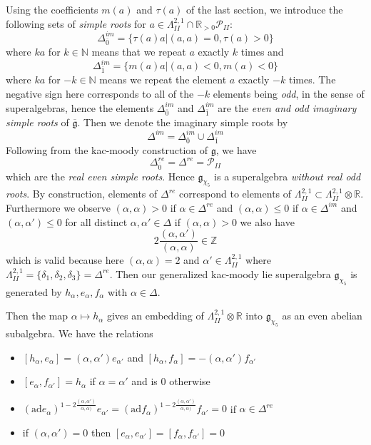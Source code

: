 \documentclass[9pt]{amsart} \usepackage[utf8]{inputenc}
\newcommand{\N}{\mathbb{N}}
\newcommand{\Z}{\mathbb{Z}} \newcommand{\C}{\mathbb{C}}
\newcommand{\R}{\mathbb{R}} \newcommand{\La}{\Lambda}
\newcommand{\Poly}{\mathcal{P}}
\newcommand{\bkm}{\mathfrak{g}}
\newcommand{\autcor}{\mathfrak{g}_{\chi_5}}
\begin{document}
Using the coefficients $m(a)$ and $\tau(a)$ of the last section, we
introduce the following sets of \textit{simple roots} for $a \in
\La^{2,1}_{II} \cap \R_{>0} \Poly_{II}$:
$$\Delta_{\overline{0}}^{im} = \{\tau(a)a | (a,a) = 0,\tau(a)>0\}$$
where $ka$ for $k\in \N$ means that we repeat $a$ exactly $k$ times and
$$\Delta_{\overline{1}}^{im} = \{ m(a)a | (a,a) < 0 , m(a)< 0\}$$
where $ka$ for $-k \in \N$ means we repeat the element $a$ exactly $-k$
times. The negative sign here corresponds to all of the $-k$ elements
being \textit{odd}, in the sense of superalgebras, hence the elements
$\Delta_{\overline{0}}^{im}$ and $\Delta_{\overline{1}}^{im}$ are the
\textit{even and odd imaginary simple roots} of
$\overline{\mathfrak{g}}$.
Then we denote the imaginary simple roots by $$\Delta^{im} =
\Delta_{\overline{0}}^{im} \cup \Delta_{\overline{1}}^{im}$$
Following from the kac-moody construction of $\bkm$, we
have $$\Delta_{\overline{0}}^{re} = \Delta^{re} = \Poly_{II}$$ which are
the \textit{real even simple roots}. Hence
$\autcor$ is a superalgebra \textit{without real odd
roots}. By construction, elements of $\Delta^{re}$ correspond to
elements of $\La^{2,1}_{II} \subset \La^{2,1}_{II}\otimes \R$.
Furthermore we observe $(\alpha,\alpha) > 0$ if $\alpha \in \Delta^{re}$
and $(\alpha,\alpha) \leq 0$ if $\alpha \in \Delta^{im}$ and
$(\alpha,\alpha') \leq 0$ for all distinct $\alpha, \alpha' \in \Delta$ if
$(\alpha,\alpha) > 0$ we also have
$$2\frac{(\alpha,\alpha')}{(\alpha,\alpha)} \in \Z$$ which is valid
because here $(\alpha,\alpha) = 2$ and $\alpha' \in \La^{2,1}_{II}$
where $\La^{2,1}_{II} = \{\delta_1,\delta_2,\delta_3\} = \Delta^{re}$.
Then our generalized kac-moody lie superalgebra
$\autcor$ is generated by $h_{\alpha},
e_{\alpha}, f_{\alpha}$ with $\alpha \in \Delta$.


Then the map $\alpha \mapsto h_{\alpha}$ gives an embedding of
$\La^{2,1}_{II}\otimes\R$ into $\autcor$ as an
even abelian subalgebra. We have the relations

\begin{itemize}
\item $[h_{\alpha}, e_{\alpha}] = (\alpha, \alpha')e_{\alpha'}$ and
$[h_{\alpha}, f_{\alpha}] = -(\alpha, \alpha')f_{\alpha'}$
\item $[e_{\alpha}, f_{\alpha'}] = h_{\alpha}$ if $\alpha = \alpha'$ and
is $0$ otherwise
\item $(\textrm{ad} e_{\alpha})^{1-
2\frac{(\alpha,\alpha')}{\alpha,\alpha)}}e_{\alpha'} = (\textrm{ad}
f_{\alpha})^{1- 2\frac{(\alpha,\alpha')}{\alpha,\alpha)}}f_{\alpha'} = 0$
if $\alpha \in \Delta^{re}$
\item if $(\alpha,\alpha') = 0$ then $[e_{\alpha}, e_{\alpha'}] =
[f_{\alpha},f_{\alpha'}] = 0$
\end{itemize}
\end{document}

